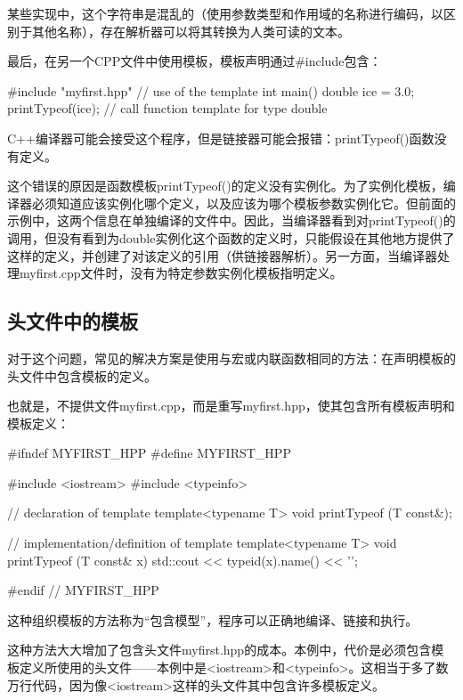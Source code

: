 \begin{notice}
某些实现中，这个字符串是混乱的（使用参数类型和作用域的名称进行编码，以区别于其他名称），存在解析器可以将其转换为人类可读的文本。
\end{notice}

最后，在另一个CPP文件中使用模板，模板声明通过\#include包含：

\begin{cpp}
#include "myfirst.hpp"
// use of the template
int main()
{
	double ice = 3.0;
	printTypeof(ice); // call function template for type double
}
\end{cpp}

C++编译器可能会接受这个程序，但是链接器可能会报错：printTypeof()函数没有定义。

这个错误的原因是函数模板printTypeof()的定义没有实例化。为了实例化模板，编译器必须知道应该实例化哪个定义，以及应该为哪个模板参数实例化它。但前面的示例中，这两个信息在单独编译的文件中。因此，当编译器看到对printTypeof()的调用，但没有看到为double实例化这个函数的定义时，只能假设在其他地方提供了这样的定义，并创建了对该定义的引用（供链接器解析）。另一方面，当编译器处理myfirst.cpp文件时，没有为特定参数实例化模板指明定义。

\subsection{头文件中的模板}

对于这个问题，常见的解决方案是使用与宏或内联函数相同的方法：在声明模板的头文件中包含模板的定义。

也就是，不提供文件myfirst.cpp，而是重写myfirst.hpp，使其包含所有模板声明和模板定义：

\begin{cpp}
#ifndef MYFIRST_HPP
#define MYFIRST_HPP

#include <iostream>
#include <typeinfo>

// declaration of template
template<typename T>
void printTypeof (T const&);

// implementation/definition of template
template<typename T>
void printTypeof (T const& x)
{
	std::cout << typeid(x).name() << '\n';
}

#endif // MYFIRST_HPP
\end{cpp}

这种组织模板的方法称为“包含模型”，程序可以正确地编译、链接和执行。

这种方法大大增加了包含头文件myfirst.hpp的成本。本例中，代价是必须包含模板定义所使用的头文件——本例中是<iostream>和<typeinfo>。这相当于多了数万行代码，因为像<iostream>这样的头文件其中包含许多模板定义。

